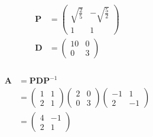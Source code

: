 \documentclass{article}
\begin{document}
\setcounter{subsubsection}{22}
\subsubsection{}

\begin{align*}
  \mathbf{P} & = \begin{pmatrix}
                   \sqrt{\frac{2}{5}} & -\sqrt{\frac{5}{2}} \\
                   1                  & 1
                 \end{pmatrix} \\
  \mathbf{D} & = \begin{pmatrix}
                   10 & 0 \\
                   0  & 3
                 \end{pmatrix}
\end{align*}

\setcounter{subsubsection}{34}
\subsubsection{}

\begin{align*}
  \mathbf{A} & = \mathbf{P} \mathbf{D} \mathbf{P}^{-1}      \\
             & = \begin{pmatrix}
                   1 & 1 \\
                   2 & 1
                 \end{pmatrix} \begin{pmatrix}
                                 2 & 0 \\
                                 0 & 3
                               \end{pmatrix} \begin{pmatrix}
                                               -1 & 1  \\
                                               2  & -1
                                             \end{pmatrix} \\
             & = \begin{pmatrix}
                   4 & -1 \\
                   2 & 1
                 \end{pmatrix}
\end{align*}

\setcounter{subsubsection}{38}
\subsubsection{}
\end{document}

